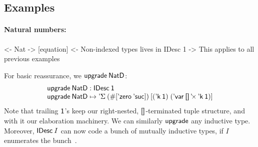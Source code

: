 %
%
%
%


\subsection{Examples}
\label{sec:idesc-examples}

\paragraph{Natural numbers:}

\begin{wstructure}
<- Nat
    -> [equation]
    <- Non-indexed types lives in IDesc 1
        -> This applies to all previous examples
\end{wstructure}

For basic reassurance, we \(\upgrade\:\NatD\):
%
\[\stk{
\upgrade\:\NatD : \IDesc{\Unit} \\
\upgrade\:\NatD \mapsto \DSigma{(\EnumT{\sqr{\NatZero\: \SYMBNatSuc}})}
                     {\sqr{(\DConst{\Unit}) \; 
                           (\DProd{\DVar{\Void}}{\DConst{\Unit}})}}
}\]
%
Note that trailing \(\Unit\)'s keep our right-nested, \(\void\)-terminated
tuple structure, and with it our elaboration machinery.
We can similarly \(\upgrade\) any inductive type.
Moreover, \(\IDesc{I}\) can now code a bunch of mutually
inductive types, if \(I\) enumerates the
bunch~\cite{paulin:habilitation, yakushev:mutual-def}.



